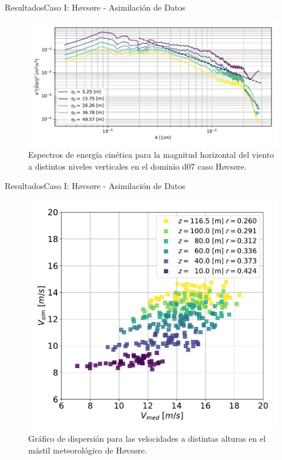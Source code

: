 \documentclass[mathserif,10pt]{beamer}
\begin{document}
\begin{frame}{Resultados}{Caso I: Høvsøre - Asimilación de Datos}
	\begin{figure}[H]
		\centering
		\hspace*{-5mm}\includegraphics[width=1.1\linewidth,page=1,trim={3mm 5mm -7mm 3mm},clip]{fig/06/hov_da/spectra}%
		\caption{Espectros de energía cinética para la magnitud horizontal del viento a distintos niveles verticales en el dominio d07 caso Høvsøre.}
		\label{fig:06_hov_da_spectrum}
	\end{figure}
\end{frame}

\begin{frame}{Resultados}{Caso I: Høvsøre - Asimilación de Datos}
	\begin{figure}[H]
		\centering
		\includegraphics[width=0.7\linewidth,page=1,trim={0cm 5mm -1cm 0cm},clip]{fig/06/hov_da/corr}%
		\vspace{-3mm}
		\caption{Gráfico de dispersión para las velocidades a distintas alturas en el mástil meteorológico de Høvsøre.}
		\label{fig:06_corr_hov_da}
	\end{figure}
\end{frame}
\end{document}
